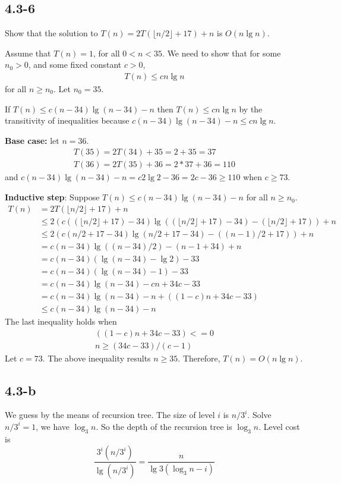\documentclass{book}
\begin{document}
\begin{CJK}{UTF8}{gkai}
\subsection*{4.3-6}
Show that the solution to $T(n) = 2T(\lfloor n/2 \rfloor + 17) + n$ is $O(n \lg n)$.

Assume that $T(n) = 1$, for all $0 < n < 35$. We need to show that for some $n_0 > 0$, 
and some fixed constant $c > 0$,
\begin{align*}
T(n) \le cn\lg n
\end{align*}
for all $n \ge n_0$. Let $n_0 = 35$.

If $T(n) \le c(n-34)\lg(n-34) - n$ then $T(n) \le cn\lg n$ by the transitivity of 
inequalities because $c(n-34)\lg(n-34) -n \le cn\lg n$. 

\textbf{Base case:} let $n = 36$.
\begin{align*}
T(35) = 2T(34) + 35 = 2 + 35 = 37 \\
T(36) = 2T(35) + 36 = 2 * 37 + 36 = 110
\end{align*}
and $c(n-34)\lg(n-34)-n = c2\lg2 - 36 = 2c - 36 \ge 110$ when $c \ge 73$.

\textbf{Inductive step}: Suppose $T(n) \le c(n-34)\lg(n-34) - n$ for all $n\ge n_0$.
\begin{align*}
T(n)  & = 2T(\lfloor n/2 \rfloor + 17) + n \\
& \le 2(c((\lfloor n/2 \rfloor+17)-34)\lg((\lfloor n/2\rfloor+17)-34)-(\lfloor n/2 \rfloor + 17)) + n \\
& \le 2(c(n/2+17-34)\lg(n/2+17-34)-((n-1)/2+17)) + n \\
& = c(n-34)\lg((n-34)/2)-(n-1+34) + n \\
& = c(n-34)(\lg(n-34)-\lg2)-33 \\
& = c(n-34)(\lg(n-34)-1)-33 \\
& = c(n-34)\lg(n-34) -cn+34c-33 \\
& = c(n-34)\lg(n-34) - n + ((1-c)n + 34c - 33) \\
& \le c(n-34)\lg(n-34) -n 
\end{align*}
The last inequality holds when 
\begin{align*}
((1-c)n+34c-33) <= 0 \\
n\ge(34c-33)/(c-1) 
\end{align*}
Let $c = 73$. The above inequality results $n \ge 35$. Therefore, $T(n) = O(n\lg n)$.

\subsection*{4.3-b}
We guess by the means of recursion tree. The size of level $i$ is $n/3^i$. Solve 
$n/3^i = 1$, we have $\log_3 n$. So the depth of the recursion tree is $\log_3n$. 
Level cost is 
\begin{equation}
\frac{3^i (n/3^i)}{\lg(n/3^i)} = \frac{n}{\lg3(\log_3 n - i)}
\end{equation}


\end{CJK}
\end{document}
